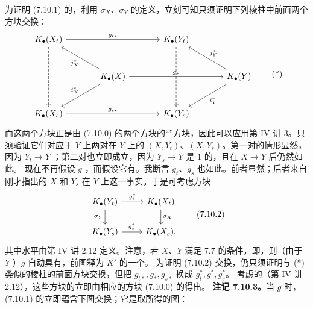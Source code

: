 为证明 (7.10.1) 的，利用 $\sigma_X$、$\sigma_Y$ 的定义，立刻可知只须证明下列棱柱中前面两个方块交换：
\[\begin{tikzcd}[row sep=large,column sep=large]K_\bullet(X_t)\arrow[rr,"g_{t*}"]\arrow[dd,dashed]&&K_\bullet(Y_t)\arrow[dd,dashed]\\&K_\bullet(X)\arrow[ul,"j_X^*"]\arrow[dl,"i_X^*"']\arrow[rr,"g_*"]&&K_\bullet(Y)\arrow[ul,"j_Y^*"']\arrow[dl,"i_Y^*"]\\K_\bullet(X_s)\arrow[rr,"g_{s*}"]&&K_\bullet(Y_s)\end{tikzcd}\tag{*}\]
而这两个方块正是由 (7.10.0) 的两个方块的“”方块，因此可以应用第 IV 讲 3。只须验证它们对应于 $Y$ 上两对在 $Y$ 上的 $(X,Y_t)$、$(X,Y_s)$。第一对的情形显然，因为 $Y_t\to Y$ ；第二对也立即成立，因为 $Y_s\to Y$ 是 $1$ 的，且在 $X\to Y$ 后仍然如此。
现在不再假设 $g$ ，而假设它有。我断言 $g_t$、$g_s$ 也如此。前者显然；后者来自刚才指出的 $X$ 和 $Y_s$ 在 $Y$ 上这一事实。于是可考虑方块
\[\begin{tikzcd}K_\bullet(Y_t)\arrow[r,"g_t^*"]\arrow[d,"\sigma_Y"']&K_\bullet(X_t)\arrow[d,"\sigma_X"]\\K_\bullet(Y_s)\arrow[r,"g_s^*"]&K_\bullet(X_s),\end{tikzcd}\tag{7.10.2}\]
其中水平由第 IV 讲 2.12 定义。注意，若 $X$、$Y$ 满足 7.7 的条件，即，则（由于 $Y$ ）$g$ 自动具有，前图释为 $K'$ 的一个。
为证明 (7.10.2) 交换，仍只须证明与 (*) 类似的棱柱的前面方块交换，但把 $g_{t*},g_*,g_{s*}$ 换成 $g_t^*,g^*,g_s^*$。
考虑的（第 IV 讲 2.12），这些方块的立即由相应的方块 (7.10.0) 的得出。
\textbf{注记 7.10.3。}当 $g$ 时，(7.10.1) 的立即蕴含下图交换；它是取所得的图：
